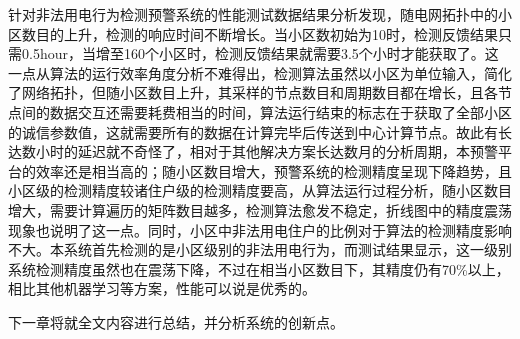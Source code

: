 针对非法用电行为检测预警系统的性能测试数据结果分析发现，随电网拓扑中的小区数目的上升，检测的响应时间不断增长。当小区数初始为10时，检测反馈结果只需0.5hour，当增至160个小区时，检测反馈结果就需要3.5个小时才能获取了。这一点从算法的运行效率角度分析不难得出，检测算法虽然以小区为单位输入，简化了网络拓扑，但随小区数目上升，其采样的节点数目和周期数目都在增长，且各节点间的数据交互还需要耗费相当的时间，算法运行结束的标志在于获取了全部小区的诚信参数值，这就需要所有的数据在计算完毕后传送到中心计算节点。故此有长达数小时的延迟就不奇怪了，相对于其他解决方案长达数月的分析周期，本预警平台的效率还是相当高的；随小区数目增大，预警系统的检测精度呈现下降趋势，且小区级的检测精度较诸住户级的检测精度要高，从算法运行过程分析，随小区数目增大，需要计算遍历的矩阵数目越多，检测算法愈发不稳定，折线图中的精度震荡现象也说明了这一点。同时，小区中非法用电住户的比例对于算法的检测精度影响不大。本系统首先检测的是小区级别的非法用电行为，而测试结果显示，这一级别系统检测精度虽然也在震荡下降，不过在相当小区数目下，其精度仍有70\%以上，相比其他机器学习等方案，性能可以说是优秀的。

下一章将就全文内容进行总结，并分析系统的创新点。